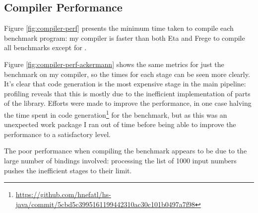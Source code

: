\documentclass[dissertation.tex]{subfiles}
\begin{document}
{    \subsection{Compiler Performance}
    {
        Figure \ref{fig:compiler-perf} presents the minimum time taken to compile each benchmark program: my compiler is faster than both Eta and Frege to compile all benchmarks except for . 

        Figure \ref{fig:compiler-perf-ackermann} shows the same metrics for just the  benchmark on my compiler, so the times for each stage can be seen more clearly. It's clear that code generation is the most expensive stage in the main pipeline: profiling reveals that this is mostly due to the inefficient implementation of parts of the  library. Efforts were made to improve the performance, in one case halving the time spent in code generation\footnote{\url{https://github.com/hnefatl/hs-java/commit/5cbd5c3995161199442310ac30c101b0497a7f98}} for the  benchmark, but as this was an unexpected work package I ran out of time before being able to improve the performance to a satisfactory level.
        
        The poor performance when compiling the  benchmark appears to be due to the large number of bindings involved: processing the list of 1000 input numbers pushes the inefficient stages to their limit. 

}}
\end{document}
